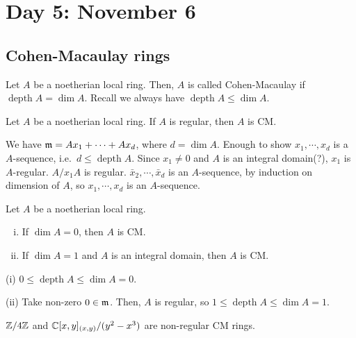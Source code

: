 \documentclass{../../../small}
\newcommand{\depth}{\operatorname{depth}}
\begin{document}
\begin{ex*}[4.13]

\end{ex*}



\newpage
\section{Day 5: November 6}


\subsection*{Cohen-Macaulay rings}

\begin{defn*}[5.1]
Let $A$ be a noetherian local ring.
Then, $A$ is called Cohen-Macaulay if $\depth A=\dim A$.
Recall we always have $\depth A\le\dim A$.
\end{defn*}

\begin{prop*}[5.2]
Let $A$ be a noetherian local ring.
If $A$ is regular, then $A$ is CM.
\end{prop*}
\begin{pf}
We have $\mathfrak{m}=Ax_1+\cdots+Ax_d$, where $d=\dim A$.
Enough to show $x_1,\cdots,x_d$ is a $A$-sequence, i.e.~$d\le\depth A$.
Since $x_1\ne0$ and $A$ is an integral domain(?), $x_1$ is $A$-regular.
$A/x_1A$ is regular.
$\bar x_2,\cdots,\bar x_d$ is an $A$-sequence, by induction on dimension of $A$, so $x_1,\cdots,x_d$ is an $A$-sequence.
\end{pf}

\begin{prop*}[5.3]
Let $A$ be a noetherian local ring.
\begin{enumerate}[(i)]
\item If $\dim A=0$, then $A$ is CM.
\item If $\dim A=1$ and $A$ is an integral domain, then $A$ is CM.
\end{enumerate}
\end{prop*}
\begin{pf}
(i)
$0\le\depth A\le\dim A=0$.

(ii)
Take non-zero $0\in\mathfrak{m}$.
Then, $A$ is regular, so $1\le\depth A\le\dim A=1$.
\end{pf}


\begin{ex*}[5.4]
$\mathbb{Z}/4\mathbb{Z}$ and $\mathbb{C}[x,y]_{(x,y)}/(y^2-x^3)$ are non-regular CM rings.
\end{ex*}
\end{document}
